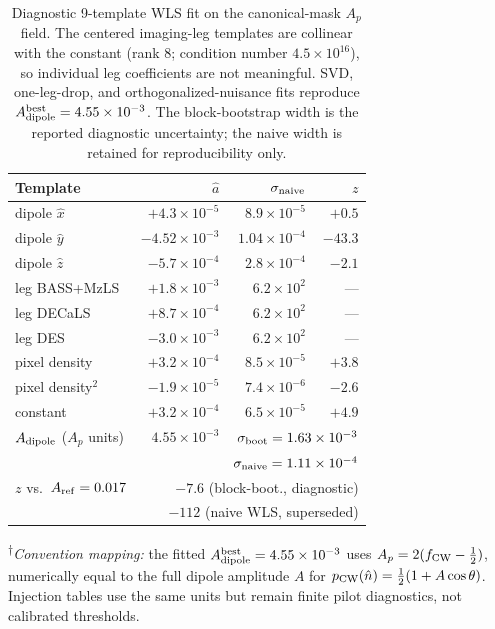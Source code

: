 \documentclass[aps,prd,twocolumn,superscriptaddress,preprintnumbers,nofootinbib,longbibliography,floatfix]{revtex4-2}
\begin{document}
\begin{table}[H]
\caption{Diagnostic 9-template WLS fit on the canonical-mask $A_p$ field. The centered imaging-leg templates are collinear with the constant (rank 8; condition number $4.5\times10^{16}$), so individual leg coefficients are not meaningful. SVD, one-leg-drop, and orthogonalized-nuisance fits reproduce $A_{\rm dipole}^{\rm best}=4.55\times10^{-3}$. The block-bootstrap width is the reported diagnostic uncertainty; the naive width is retained for reproducibility only.\label{tab:wls_fit}}
\begin{ruledtabular}
\begin{tabular}{lrrr}
\textbf{Template} & $\hat a$ & $\sigma_{\rm naive}$ & $z$ \\
\hline
dipole $\hat x$ & $+4.3\times10^{-5}$ & $8.9\times10^{-5}$ & $+0.5$ \\
dipole $\hat y$ & $-4.52\times10^{-3}$ & $1.04\times10^{-4}$ & $-43.3$ \\
dipole $\hat z$ & $-5.7\times10^{-4}$ & $2.8\times10^{-4}$ & $-2.1$ \\
leg BASS+MzLS & $+1.8\times10^{-3}$ & $6.2\times10^{2}$ & --- \\
leg DECaLS & $+8.7\times10^{-4}$ & $6.2\times10^{2}$ & --- \\
leg DES & $-3.0\times10^{-3}$ & $6.2\times10^{2}$ & --- \\
pixel density & $+3.2\times10^{-4}$ & $8.5\times10^{-5}$ & $+3.8$ \\
pixel density$^2$ & $-1.9\times10^{-5}$ & $7.4\times10^{-6}$ & $-2.6$ \\
constant & $+3.2\times10^{-4}$ & $6.5\times10^{-5}$ & $+4.9$ \\
\hline
$A_{\rm dipole}$ ($A_p$ units) & $4.55\times10^{-3}$ & \multicolumn{2}{r}{$\sigma_{\rm boot}=1.63\times10^{-3}$} \\
 & & \multicolumn{2}{r}{$\sigma_{\rm naive}=1.11\times10^{-4}$} \\
$z$ vs.\ $A_{\rm ref}=0.017$ & \multicolumn{3}{r}{$-7.6$ (block-boot., diagnostic)} \\
 & \multicolumn{3}{r}{$-112$ (naive WLS, superseded)} \\
\end{tabular}
\end{ruledtabular}
\textsuperscript{$\dagger$}\emph{Convention mapping:} the fitted $A_{\rm dipole}^{\rm best}=4.55\times10^{-3}$ uses $A_p=2(f_{\rm CW}-\tfrac12)$, numerically equal to the full dipole amplitude $A$ for $p_{\rm CW}(\hat n)=\tfrac12(1+A\cos\theta)$. Injection tables use the same units but remain finite pilot diagnostics, not calibrated thresholds.
\end{table}
\end{document}
